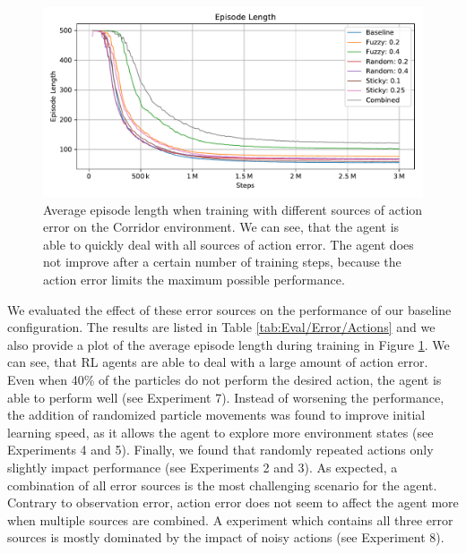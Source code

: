 \begin{figure}[htp]
    \begin{center}
        \includegraphics[clip, width=0.9\columnwidth]{figures/evaluation/error/action_error_ep_len.pdf}
    \end{center}
    \caption[Episode Length During Training with Action Error]{Average episode length when training with different sources of action error on the Corridor environment. We can see, that the agent is able to quickly deal with all sources of action error. The agent does not improve after a certain number of training steps, because the action error limits the maximum possible performance.} \label{fig:Eval/Error/ActionsTrain}
\end{figure}

We evaluated the effect of these error sources on the performance of our baseline configuration. The results are listed in Table \ref{tab:Eval/Error/Actions} and we also provide a plot of the average episode length during training in Figure \ref{fig:Eval/Error/ActionsTrain}. We can see, that RL agents are able to deal with a large amount of action error. Even when 40\% of the particles do not perform the desired action, the agent is able to perform well (see Experiment 7). Instead of worsening the performance, the addition of randomized particle movements was found to improve initial learning speed, as it allows the agent to explore more environment states (see Experiments 4 and 5). Finally, we found that randomly repeated actions only slightly impact performance (see Experiments 2 and 3). As expected, a combination of all error sources is the most challenging scenario for the agent. Contrary to observation error, action error does not seem to affect the agent more when multiple sources are combined. A experiment which contains all three error sources is mostly dominated by the impact of noisy actions (see Experiment 8).  


